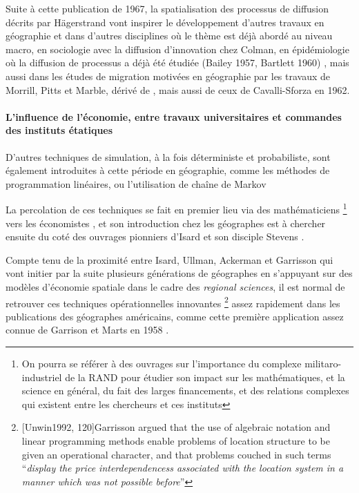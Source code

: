 Suite à cette publication de 1967, la spatialisation des processus de diffusion décrits par Hägerstrand vont inspirer le développement d'autres travaux en géographie et dans d'autres disciplines où le thème est déjà abordé au niveau macro, en sociologie avec la diffusion d'innovation chez Colman, en épidémiologie \autocite{Cliff1981, Cliff2000} où la diffusion de processus a déjà été étudiée (Bailey 1957, Bartlett 1960) \autocite{Pitts1963, Morrill1968}, mais aussi dans les études de migration motivées en géographie par les travaux de Morrill, Pitts et Marble, dérivé de \autocite{Wolpert1965}, mais aussi de ceux de Cavalli-Sforza en 1962. 

\paragraph{L'influence de l'économie, entre travaux universitaires et commandes des instituts étatiques}

D'autres techniques de simulation, à la fois déterministe et probabiliste, sont également introduites à cette période en géographie, comme les méthodes de programmation linéaires, ou l'utilisation de chaîne de Markov \autocites{Marble1964, Clark1965} 

La percolation de ces techniques se fait en premier lieu via des mathématiciens \footnote{On pourra se référer à des ouvrages sur l'importance du complexe militaro-industriel de la RAND pour étudier son impact sur les mathématiques, et la science en général, du fait des larges financements, et des relations complexes qui existent entre les chercheurs et ces instituts} vers les économistes \autocite{Samuelson1952}, et son introduction chez les géographes est à chercher ensuite du coté des ouvrages pionniers d'Isard \autocite{Isard1956} \autocite{Isard1958} et son disciple Stevens \autocite{Stevens1958}.

Compte tenu de la proximité entre Isard, Ullman, Ackerman et Garrisson \autocite{Barnes2004} qui vont initier \autocite[120]{Unwin1992} par la suite plusieurs générations de géographes en s'appuyant sur des modèles d'économie spatiale dans le cadre des \textit{regional sciences}, il est normal de retrouver ces techniques opérationnelles innovantes \footnote{ [Unwin1992, 120]{Garrisson argued that the use of algebraic notation and linear programming methods enable problems of location structure to be given an operational character, and that problems couched in such terms \enquote{\textit{display the price interdependencess associated with the location system in a manner which was not possible before}}}} assez rapidement dans les publications des géographes américains, comme cette première application assez connue de Garrison et Marts en 1958 \autocite{Garrison1958}.

